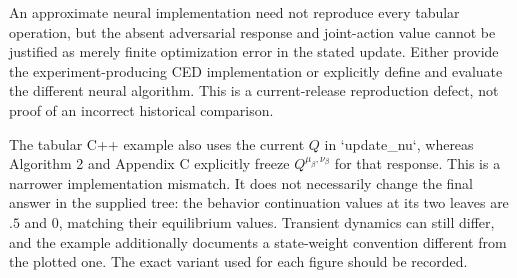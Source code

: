 \documentclass[10pt]{article}
\begin{document}
An approximate neural implementation need not reproduce every tabular operation, but the absent adversarial response and joint-action value cannot be justified as merely finite optimization error in the stated update. Either provide the experiment-producing CED implementation or explicitly define and evaluate the different neural algorithm. This is a current-release reproduction defect, not proof of an incorrect historical comparison.\par
The tabular C++ example also uses the current \(Q\) in `update\_nu`, whereas Algorithm 2 and Appendix C explicitly freeze \(Q^{\mu_\beta,\nu_\beta}\) for that response. This is a narrower implementation mismatch. It does not necessarily change the final answer in the supplied tree: the behavior continuation values at its two leaves are \(.5\) and \(0\), matching their equilibrium values. Transient dynamics can still differ, and the example additionally documents a state-weight convention different from the plotted one. The exact variant used for each figure should be recorded.\par
\end{document}
